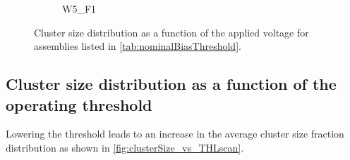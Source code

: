 \begin{figure}[htbp]
\begin{subfigure}[b]{0.33\textwidth}
    \caption{W5\_F1}
  \end{subfigure}%
  \caption{Cluster size distribution as a function of the applied
    voltage for assemblies listed in \cref{tab:nominalBiasThreshold}.}
  \label{fig:clusterSize_vs_biasVoltage}
\end{figure}

\newpage
\subsection{Cluster size distribution as a function of the operating
  threshold}

Lowering the threshold leads to an increase in the average cluster
size fraction distribution as shown in
\cref{fig:clusterSize_vs_THLscan}.

